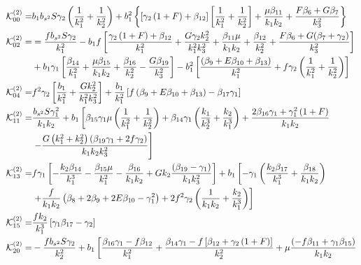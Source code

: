 \begin{align*}
\ko_{00}^{(2)}=& b_1 b_{s^2} S \gamma_2 \left( \frac{1}{k_1^2} + \frac{1}{k_2^2} \right) + b_1^2 \left\{ \left[ \gamma_2 \left( 1 + F \right) + \beta_{12}\right] \left[\frac{1}{k_1^2} + \frac{1}{k_2^2} \right] + \frac{\mu \beta_{11}}{k_1 k_2} + \frac{F \beta_{6} + G \beta_{7} }{k_3^2}\right\}\\
%
\ko_{02}^{(2)}=& =\frac{f b_{s^2} S \gamma_2}{k_1^2} - b_1 f \left[  \frac{\gamma_2 \left( 1+F  \right) + \beta_{12}}{k_1^2} + \frac{G \gamma_2 k_2^2 }{k_1^2 k_3^2} + \frac{\beta_{11} \mu}{k_1 k_2} + \frac{\beta_{12}}{k_2^2} + \frac{F \beta_{6} + G (\beta_{7} + \gamma_2)}{k_3^2} \right]  \\
&+ b_1 \gamma_1 \left[ \frac{\beta_{14} }{k_1^2} + \frac{\mu \beta_{15} }{k_1 k_2} + \frac{\beta_{16}}{k_2^2} - \frac{G \beta_{19}}{k_3^2}\right] - b_1^2 \left[ \frac{\left(\beta_{9} + E \beta_{10} + \beta_{13}\right)}{k_1^2} + f \gamma_2 \left(\frac{1}{k_1^2} + \frac{1}{k_2^2} \right) \right] \\
\ko_{04}^{(2)}=& f^2 \gamma_2 \left[ \frac{b_1}{k_1^2} + \frac{G k_2^2}{k_1^2 k_3^2} \right] + \frac{b_1}{k_1^2} \left[ f \left( \beta_{9} + E \beta_{10} + \beta_{13} \right) - \beta_{17} \gamma_1 \right]\\
\ko_{11}^{(2)}=& \frac{b_{s^2} S \gamma_1^2}{k_1 k_2} + b_1 \left[ \beta_{15} \gamma_1 \mu \left(\frac{1}{k_1^2} + \frac{1}{k_2^2} \right) + \beta_{14} \gamma_1 \left( \frac{k_1}{k_2^3} + \frac{k_2}{k_1^3} \right) + \frac{2 \beta_{16} \gamma_1 + \gamma_1^2\left(1+F\right)}{k_1 k_2} \right.\\
&\left.- \frac{G \left(k_1^2 + k_2^2\right) \left(\beta_{19} \gamma_1  + 2 f \gamma_2\right)}{k_1 k_2 k_3^2} \right]\\
\ko_{13}^{(2)} =& f \gamma_1 \left[ - \frac{k_2 \beta_{14}}{k_1^3} - \frac{\beta_{15} \mu}{k_1^2} - \frac{\beta_{16}}{k_1 k_2} + G k_2 \frac{\left(\beta_{19} - \gamma_1\right)}{k_1 k_3^2}  \right] + b_1 \left[ -\gamma_1 \left( \frac{k_2 \beta_{17}}{k_1^3} + \frac{\beta_{18}}{k_1 k_2}\right) \right.  \\
&\left. + \frac{f}{k_1 k_2} \left(  \beta_{8} + 2 \beta_{9} + 2 E \beta_{10} - \gamma_1^2 \right) + 2 f^2 \gamma_2 \left( \frac{1}{k_1 k_2 }  + \frac{k_2}{k_1^3 }\right)\right] \\
\ko_{15}^{(2)}=& \frac{f k_2}{k_1^3} \left[ \gamma_1 \beta_{17} - \gamma_2 \right] \\
\ko_{20}^{(2)}=& - \frac{f b_{s^2} S \gamma_2}{k_2^2}  + b_1 \left[ \frac{\beta_{16} \gamma_1 - f \beta_{12}}{k_1^2} + \frac{\beta_{14} \gamma_1 - f \left[\beta_{12} + \gamma_2\left(1+F\right) \right]}{k_2^2} + \mu \frac{\left(- f \beta_{11} + \gamma_1 \beta_{15}\right)}{k_1 k_2}  \right. \\

\end{align*}
